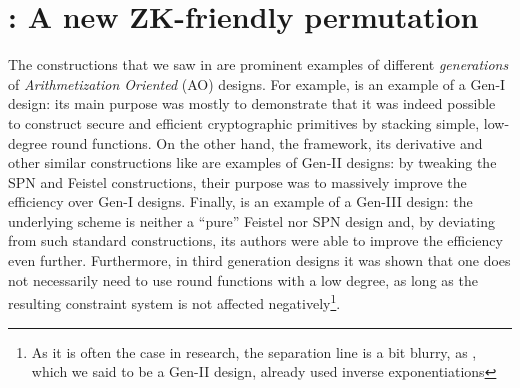 \section{\Arion{}: A new ZK-friendly permutation}\label{sec:gtds}
The constructions that we saw in  are prominent examples of different 
\emph{generations} of \emph{Arithmetization Oriented} (AO) designs.
For example, \Mimc{} is an example of a Gen-I design: its main purpose was mostly to demonstrate 
that it was indeed possible to construct secure and efficient cryptographic primitives by 
stacking simple, low-degree round functions.
On the other hand, the \Hades{} framework, its derivative \Poseidon{} and other similar 
constructions like \Rescue{} are examples of Gen-II designs: by tweaking the SPN and 
Feistel constructions, their purpose was to massively improve the efficiency over Gen-I designs.
Finally, \Griffin{} is an example of a Gen-III design: the underlying \Horst{} scheme is neither 
a ``pure'' Feistel nor SPN design and, by deviating from such standard constructions, its authors 
were able to improve the efficiency even further. 
Furthermore, in third generation designs it was shown that one does not necessarily need to use 
round functions with a low degree, as long as the resulting constraint system is not affected 
negatively\footnote{As it is often the case in research, the separation line is a bit blurry, 
as \Rescue, which we said to be a Gen-II design, already used inverse exponentiations}.

